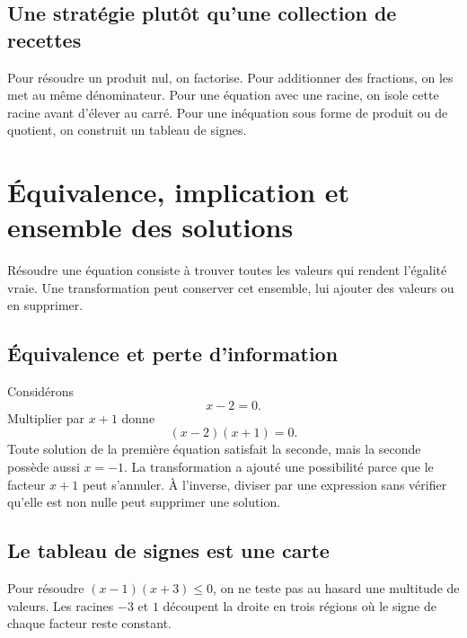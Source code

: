 \subsection{Une stratégie plutôt qu'une collection de recettes}
Pour résoudre un produit nul, on factorise. Pour additionner des fractions, on les met au même dénominateur. Pour une équation avec une racine, on isole cette racine avant d'élever au carré. Pour une inéquation sous forme de produit ou de quotient, on construit un tableau de signes.


\section{Équivalence, implication et ensemble des solutions}
\label{manual:section:02.07}

Résoudre une équation consiste à trouver toutes les valeurs qui rendent l'égalité vraie. Une transformation peut conserver cet ensemble, lui ajouter des valeurs ou en supprimer.

\subsection{Équivalence et perte d'information}
Considérons
\[
x-2=0.
\]
Multiplier par $x+1$ donne
\[
(x-2)(x+1)=0.
\]
Toute solution de la première équation satisfait la seconde, mais la seconde possède aussi $x=-1$. La transformation a ajouté une possibilité parce que le facteur $x+1$ peut s'annuler. À l'inverse, diviser par une expression sans vérifier qu'elle est non nulle peut supprimer une solution.

\begin{center}
\end{center}

\subsection{Le tableau de signes est une carte}
Pour résoudre $(x-1)(x+3)\le0$, on ne teste pas au hasard une multitude de valeurs. Les racines $-3$ et $1$ découpent la droite en trois régions où le signe de chaque facteur reste constant.

